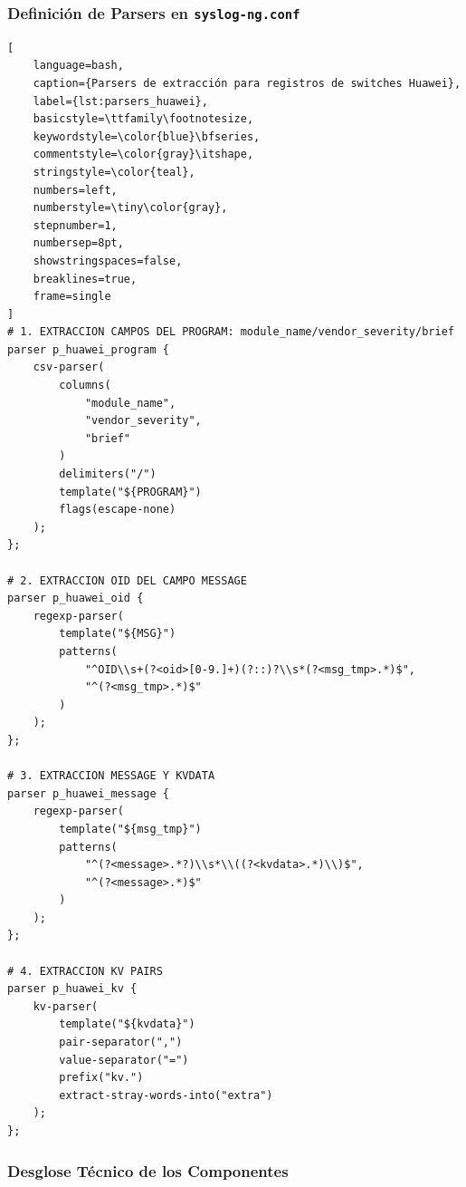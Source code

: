 \subsubsection{Definición de Parsers en \texttt{syslog-ng.conf}}

\begin{lstlisting}[
    language=bash,
    caption={Parsers de extracción para registros de switches Huawei},
    label={lst:parsers_huawei},
    basicstyle=\ttfamily\footnotesize,
    keywordstyle=\color{blue}\bfseries,
    commentstyle=\color{gray}\itshape,
    stringstyle=\color{teal},
    numbers=left,
    numberstyle=\tiny\color{gray},
    stepnumber=1,
    numbersep=8pt,
    showstringspaces=false,
    breaklines=true,
    frame=single
]
# 1. EXTRACCION CAMPOS DEL PROGRAM: module_name/vendor_severity/brief
parser p_huawei_program {
    csv-parser(
        columns(
            "module_name",
            "vendor_severity",
            "brief"
        )
        delimiters("/")
        template("${PROGRAM}")
        flags(escape-none)
    );
};

# 2. EXTRACCION OID DEL CAMPO MESSAGE
parser p_huawei_oid {
    regexp-parser(
        template("${MSG}")
        patterns(
            "^OID\\s+(?<oid>[0-9.]+)(?::)?\\s*(?<msg_tmp>.*)$",
            "^(?<msg_tmp>.*)$"
        )
    );
};

# 3. EXTRACCION MESSAGE Y KVDATA
parser p_huawei_message {
    regexp-parser(
        template("${msg_tmp}")
        patterns(
            "^(?<message>.*?)\\s*\\((?<kvdata>.*)\\)$",
            "^(?<message>.*)$"
        )
    );
};

# 4. EXTRACCION KV PAIRS
parser p_huawei_kv {
    kv-parser(
        template("${kvdata}")
        pair-separator(",")
        value-separator("=")
        prefix("kv.")
        extract-stray-words-into("extra")
    );
};
\end{lstlisting}

\subsubsection{Desglose Técnico de los Componentes}

